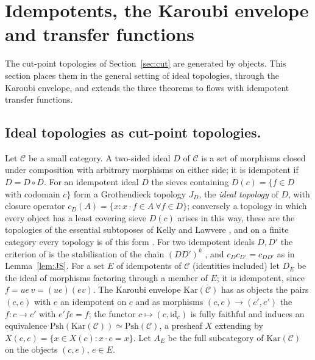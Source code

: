 \documentclass[11pt]{amsart}
\theoremstyle{definition}
\newcommand{\Psh}{\mathrm{Psh}}
\begin{document}
\section{Idempotents, the Karoubi envelope and transfer functions}\label{sec:kar}

The cut-point topologies of Section~\ref{sec:cut} are generated by
objects. This section places them in the general setting of ideal
topologies, through the Karoubi envelope, and extends the three theorems
to flows with idempotent transfer functions.

\subsection{Ideal topologies as cut-point topologies.}
Let $\mathcal C$ be a small category. A two-sided ideal $D$ of
$\mathcal C$ is a set of morphisms closed under composition with
arbitrary morphisms on either side; it is idempotent if $D=D\circ D$.
For an idempotent ideal $D$ the sieves containing $D(c)=\{f\in D$ with
codomain $c\}$ form a Grothendieck topology $J_D$, the \emph{ideal
topology} of $D$, with closure operator $c_D(A)=\{x:x\cdot f\in A\
\forall f\in D\}$; conversely a topology in which every object has a
least covering sieve $D(c)$ arises in this way, these are the topologies
of the essential subtoposes of Kelly and Lawvere \cite{KL89}, and on a
finite category every topology is of this form
\cite{KL89,Marques25}. For two idempotent ideals $D,D'$ the criterion
of \cite[Thm.~B]{Fijoin} is the stabilisation of the chain
$(DD')^k$ \cite[Cor.~1.3]{Stabjoin}, and $c_Dc_{D'}=c_{DD'}$ as in
Lemma~\ref{lem:JS}. For a set $E$ of idempotents of $\mathcal C$
(identities included) let $D_E$ be the ideal of morphisms factoring
through a member of $E$; it is idempotent, since $f=ue\,v=(ue)(ev)$. The
Karoubi envelope $\mathrm{Kar}(\mathcal C)$ has as objects the pairs
$(c,e)$ with $e$ an idempotent on $c$ and as morphisms $(c,e)\to(c',e')$
the $f\colon c\to c'$ with $e'fe=f$; the functor $c\mapsto(c,\mathrm{id}_c)$
is fully faithful and induces an equivalence
$\Psh(\mathrm{Kar}(\mathcal C))\simeq\Psh(\mathcal C)$, a presheaf $X$
extending by $X(c,e)=\{x\in X(c):x\cdot e=x\}$. Let $A_E$ be the full
subcategory of $\mathrm{Kar}(\mathcal C)$ on the objects $(c,e)$, $e\in E$.
\end{document}
